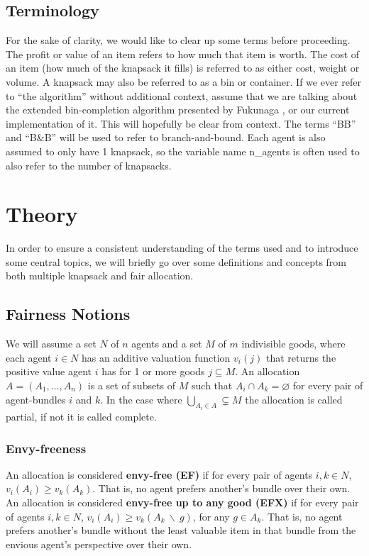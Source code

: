\documentclass[b5paper]{article}
\begin{document}
\subsection{Terminology}
For the sake of clarity, we would like to clear up some terms before proceeding.
The profit or value of an item refers to how much that item is worth.
The cost of an item (how much of the knapsack it fills) is referred to as either cost, weight or volume.
A knapsack may also be referred to as a bin or container.
If we ever refer to ``the algorithm'' without additional context, assume that we are talking about the extended bin-completion algorithm presented by Fukunaga \cite{fukunaga_branch-and-bound_2011},
or our current implementation of it. This will hopefully be clear from context. The terms ``BB'' and ``B\&B'' will be used to refer to branch-and-bound.
Each agent is also assumed to only have 1 knapsack, so the variable name n\_agents is often used to also refer to the number of knapsacks.

\section{Theory}
In order to ensure a consistent understanding of the terms used and to introduce some central topics,
we will briefly go over some definitions and concepts from both multiple knapsack and fair allocation.

\subsection{Fairness Notions}
We will assume a set $N$ of $n$ agents and a set $M$ of $m$ indivisible goods, where each agent $i \in N$
has an additive valuation function $v_i(j)$ that returns the positive value agent $i$ has for 1 or more goods $j \subseteq M$.
An allocation $A = (A_1, \ldots, A_n)$ is a set of subsets of $M$ such that $A_i \cap A_k = \varnothing$ for every pair of agent-bundles $i$ and $k$. 
In the case where $\bigcup_{A_i \in A} \subsetneq M$ the allocation is called partial, if not it is called complete.
\subsubsection{Envy-freeness}
An allocation is considered \textbf{envy-free (EF)} if for every pair of agents $i, k \in N$,
$v_i(A_i)  \geq  v_k(A_k)$. That is, no agent prefers another's bundle over their own.\\

An allocation is considered \textbf{envy-free up to any good (EFX)} if for every pair of agents $i, k \in N$,
$v_i(A_i) \geq v_k(A_k \: \backslash \: g)$, for any $g \in A_k$. That is, no agent prefers another's bundle without the least valuable item in that bundle from the envious agent's perspective over their own.\\
\end{document}
